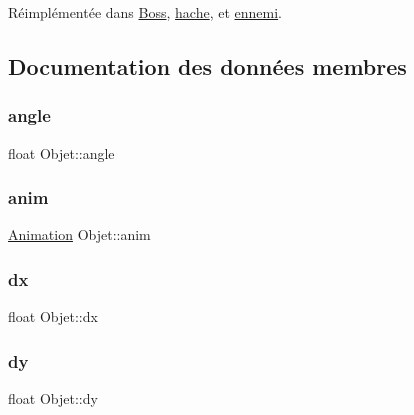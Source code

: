 Réimplémentée dans \hyperlink{class_boss_ab3b0e756ba923f88c8afea3ed3af552c}{Boss}, \hyperlink{classhache_a0b491958a8b90c3f6cc79e28e094a410}{hache}, et \hyperlink{classennemi_a52bb08c9e3c5597d0019857dc43f3351}{ennemi}.



\subsection{Documentation des données membres}
\mbox{\label{class_objet_a1e3e095030fbc53562c5561cabd2e800}} 
\subsubsection{\texorpdfstring{angle}{angle}}
{\footnotesize\ttfamily float Objet\+::angle}

\mbox{\label{class_objet_a4d1cd0327bccc4022d7b9bbba2c041b5}} 
\subsubsection{\texorpdfstring{anim}{anim}}
{\footnotesize\ttfamily \hyperlink{class_animation}{Animation} Objet\+::anim}

\mbox{\label{class_objet_ae31175118003ae9a862c9ce10f853045}} 
\subsubsection{\texorpdfstring{dx}{dx}}
{\footnotesize\ttfamily float Objet\+::dx}

\mbox{\label{class_objet_a6e0d923cb4450478ed31e94ee7f5a531}} 
\subsubsection{\texorpdfstring{dy}{dy}}
{\footnotesize\ttfamily float Objet\+::dy}

\mbox{\label{class_objet_aec3ba4223b80d485e9c8c72b17d53b3a}} 
